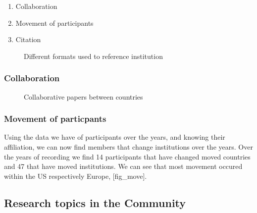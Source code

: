 \documentclass[journal,twocolumn]{IEEEtran}
\providecommand{\tightlist}{%
      \setlength{\itemsep}{0pt}\setlength{\parskip}{0pt}}
\begin{document}
\begin{enumerate}
\def\labelenumi{\arabic{enumi}.}
\tightlist
\item
  Collaboration
\item
  Movement of participants
\item
  Citation
\end{enumerate}


    \begin{figure}
        \begin{center}\end{center}
        \caption{Different formats used to reference institution}
        \label{figrep}
    \end{figure}
    
    \hypertarget{collaboration}{%
\subsubsection{Collaboration}\label{collaboration}}


    \begin{figure}
        \begin{center}\end{center}
        \caption{Collaborative papers between countries}
        \label{figcollab}
    \end{figure}
    
    \hypertarget{movement-of-particpants}{%
\subsubsection{Movement of particpants}\label{movement-of-particpants}}

Using the data we have of participants over the years, and knowing their
affiliation, we can now find members that change institutions over the
years. Over the years of recording we find 14 participants that have
changed moved countries and 47 that have moved institutions. We can see
that most movement occured within the US respectively Europe,
{[}fig\_move{]}.

    \hypertarget{research-topics-in-the-community}{%
\subsection{Research topics in the
Community}\label{research-topics-in-the-community}}
\end{document}
